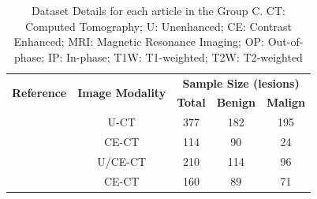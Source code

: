 \documentclass{article}
\begin{document}
\begin{table}[]
    \centering
    \begin{tabular}{ccccc}\toprule
        \multirow{2}{*}{\textbf{Reference}} & \multirow{2}{*}{\textbf{Image Modality}} & \multicolumn{3}{c}{\textbf{Sample Size (lesions)}}
        \\\cmidrule(lr){3-5}
                                            &                                          & \textbf{Total}                                     & \textbf{Benign} & \textbf{Malign} \\\midrule
        \cite{Bi2017}                       & U-CT                                     & 377                                                & 182             & 195             \\
        \cite{Bi2022}                       & CE-CT                                    & 114                                                & 90              & 24              \\
        \cite{Kong2022}                     & U/CE-CT                                  & 210                                                & 114             & 96              \\
        \cite{Zheng2020}                    & CE-CT                                    & 160                                                & 89              & 71              \\
        \bottomrule
    \end{tabular}
    \caption{Dataset Details for each article in the Group C. CT: Computed Tomography; U: Unenhanced; CE: Contrast Enhanced; MRI: Magnetic Resonance Imaging; OP: Out-of-phase; IP: In-phase; T1W: T1-weighted; T2W: T2-weighted}
    \label{tab:data_C}
\end{table}
\end{document}
